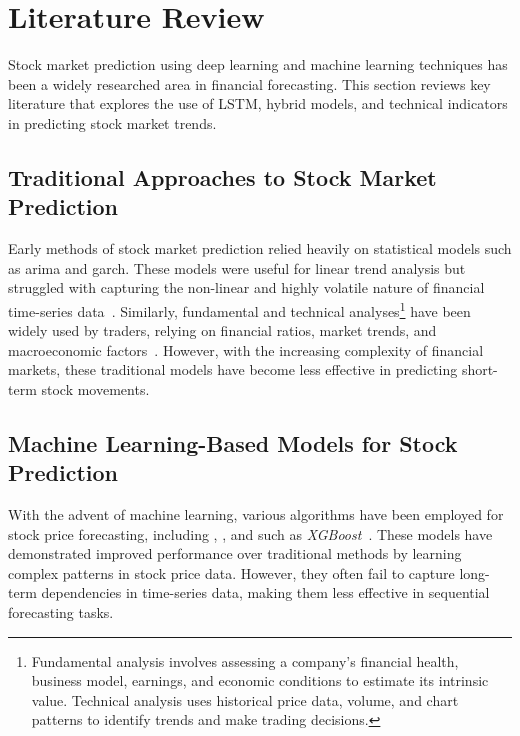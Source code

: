 \clearpage
\section{Literature Review}

Stock market prediction using deep learning and machine learning techniques has been 
a widely researched area in financial forecasting. This section reviews key 
literature that explores the use of LSTM, hybrid models, and technical indicators 
in predicting stock market trends.

\subsection{Traditional Approaches to Stock Market Prediction}

Early methods of stock market prediction relied heavily on statistical models such as 
\acrfull{arima} and \acrfull{garch}. These models were useful for linear trend
analysis but struggled with capturing the non-linear and highly volatile nature of
financial time-series data~\parencite{guo2024LSTMStock}. Similarly, fundamental and
technical analyses\footnote{Fundamental analysis involves assessing a company's 
financial health, business model, earnings, and economic conditions to estimate its 
intrinsic value. Technical analysis uses historical price data, volume, and chart 
patterns to identify trends and make trading decisions.} have been widely used by 
traders, relying on financial ratios, 
market trends, and macroeconomic 
factors~\parencite{balasubramanian2023SystematicSurvey}. However, with the increasing
complexity of financial markets, these traditional models have become less effective
in predicting short-term stock movements.

\subsection{Machine Learning-Based Models for Stock Prediction}

With the advent of machine learning, various algorithms have been employed for stock price
forecasting, including , , and  such as 
\emph{XGBoost}~\parencite{nabipour2020DeepLearning}. These models have demonstrated 
improved performance over 
traditional methods by learning complex patterns in stock price data. However, they often 
fail to capture long-term dependencies in time-series data, making them less effective in 
sequential forecasting tasks.


